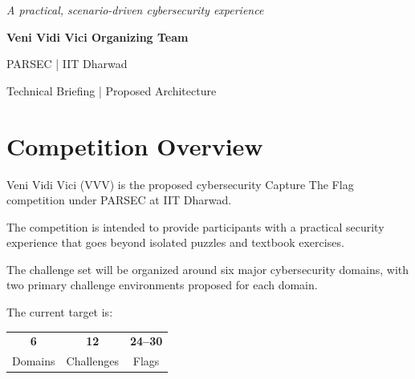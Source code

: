 \documentclass[11pt,a4paper]{article}
\begin{document}
\begin{titlepage}
\begin{center}
{\large
\textit{
A practical, scenario-driven cybersecurity experience
}
}

\vfill

{\large
\textbf{Veni Vidi Vici Organizing Team}
}

\vspace{0.25cm}

{\large
PARSEC | IIT Dharwad
}

\vspace{0.8cm}

{\small
Technical Briefing | Proposed Architecture
}

\end{center}

\end{titlepage}



\tableofcontents

\newpage



\section{Competition Overview}

Veni Vidi Vici (VVV) is the proposed cybersecurity Capture The Flag
competition under PARSEC at IIT Dharwad.

The competition is intended to provide participants with a practical
security experience that goes beyond isolated puzzles and textbook
exercises.

The challenge set will be organized around six major cybersecurity
domains, with two primary challenge environments proposed for each
domain.

The current target is:

\begin{center}

\begin{tabular}{ccc}

\textbf{6} &
\textbf{12} &
\textbf{24--30}
\\

Domains &
Challenges &
Flags

\end{tabular}

\end{center}
\end{document}
